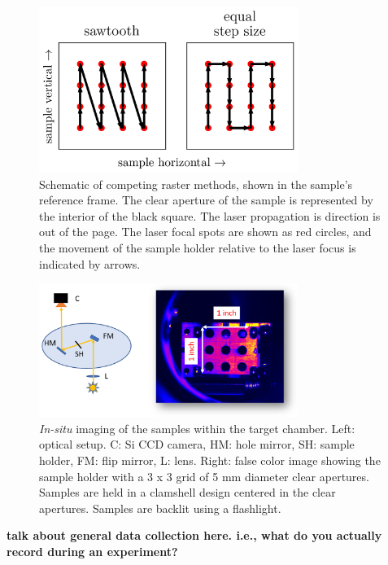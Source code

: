 \begin{figure}
	\centering
	\includegraphics[width=0.75\textwidth]{figures/chap3/Rastering_Methods.png}
	\caption{Schematic of competing raster methods, shown in the sample's reference frame. The clear aperture of the sample is represented by the interior of the black square. The laser propagation is direction is out of the page. The laser focal spots are shown as red circles, and the movement of the sample holder relative to the laser focus is indicated by arrows.}
	\label{fig:Rastering_Methods}
\end{figure}

\begin{figure}
	\centering
	\includegraphics[width=0.75\textwidth]{figures/chap3/sample_holder.png}
	\caption{\textit{In-situ} imaging of the samples within the target chamber. Left: optical setup. C: Si CCD camera, HM: hole mirror, SH: sample holder, FM: flip mirror, L: lens. Right: false color image showing the sample holder with a 3 x 3 grid of 5 mm diameter clear apertures. Samples are held in a clamshell design centered in the clear apertures. Samples are backlit using a flashlight.}
	\label{fig:sample_holder}
\end{figure}

\textbf{talk about general data collection here. i.e., what do you actually record during an experiment?}

